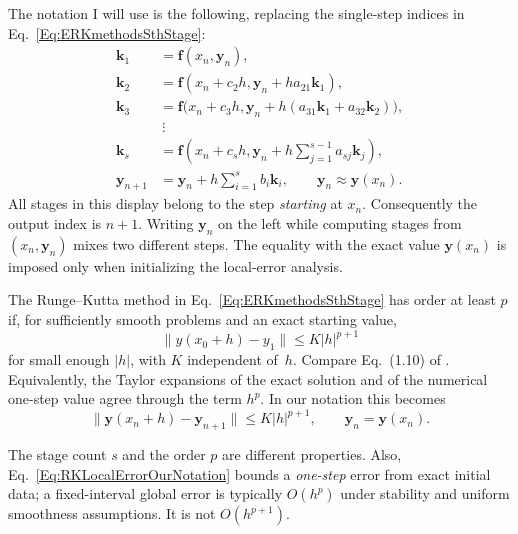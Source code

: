 The notation I will use is the following, replacing the single-step indices
in Eq.~\ref{Eq:ERKmethodsSthStage}:
\begin{equation}\label{Eq:ERKmethodsSthStageMyNotation}
\begin{aligned}
 \mathbf k_1&=\mathbf f(x_n,\mathbf y_n),\\
 \mathbf k_2&=\mathbf f(x_n+c_2h,\mathbf y_n+ha_{21}\mathbf k_1),\\
 \mathbf k_3&=\mathbf f\bigl(x_n+c_3h,
              \mathbf y_n+h(a_{31}\mathbf k_1+a_{32}\mathbf k_2)\bigr),\\
 &\ \vdots\\
 \mathbf k_s&=\mathbf f\left(x_n+c_sh,
                  \mathbf y_n+h\sum_{j=1}^{s-1}a_{sj}\mathbf k_j\right),\\
 \mathbf y_{n+1}&=\mathbf y_n+h\sum_{i=1}^s b_i\mathbf k_i,
 \qquad \mathbf y_n\approx\mathbf y(x_n).
\end{aligned}
\end{equation}
All stages in this display belong to the step \emph{starting} at $x_n$.
Consequently the output index is $n+1$. Writing $\mathbf y_n$ on the left
while computing stages from $(x_n,\mathbf y_n)$ mixes two different steps.
The equality with the exact value $\mathbf y(x_n)$ is imposed only when
initializing the local-error analysis.

\begin{definition}
The Runge--Kutta method in Eq.~\ref{Eq:ERKmethodsSthStage} has order at
least $p$ if, for sufficiently smooth problems and an exact starting value,
\begin{equation}\label{Eq:RungeKuttaMethodOrderpConditionDefinition}
 \|y(x_0+h)-y_1\|\leq K|h|^{p+1}
\end{equation}
for small enough $|h|$, with $K$ independent of~$h$. Compare Eq.~(1.10)
of \cite{HNW1993}. Equivalently, the Taylor expansions of the exact solution
and of the numerical one-step value agree through the term $h^p$.
In our notation this becomes
\begin{equation}\label{Eq:RKLocalErrorOurNotation}
 \|\mathbf y(x_n+h)-\mathbf y_{n+1}\|\leq K|h|^{p+1},
 \qquad \mathbf y_n=\mathbf y(x_n).
\end{equation}
\end{definition}
The stage count $s$ and the order $p$ are different properties. Also,
Eq.~\ref{Eq:RKLocalErrorOurNotation} bounds a \emph{one-step} error from
exact initial data; a fixed-interval global error is typically $O(h^p)$
under stability and uniform smoothness assumptions. It is not $O(h^{p+1})$.

